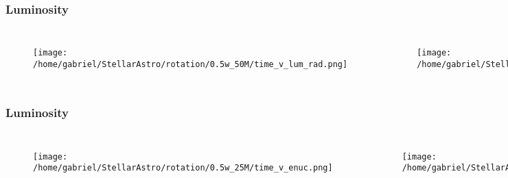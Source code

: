 \documentclass{beamer}
\begin{document}
\begin{frame}
\frametitle{Luminosity}
        \begin{columns}[c]
\begin{figure}
    \begin{center}
      \texttt{[image: /home/gabriel/StellarAstro/rotation/0.5w\_50M/time\_v\_lum\_rad.png]}
    \end{center}
  \end{figure}

        \begin{figure}
    \begin{center}
      \texttt{[image: /home/gabriel/StellarAstro/rotation/0.9w\_50M/time\_v\_lum\_rad.png]}
    \end{center}
  \end{figure}

        \end{columns}
\end{frame}



\begin{frame}
\frametitle{Luminosity}
        \begin{columns}[c]
\begin{figure}
    \begin{center}
      \texttt{[image: /home/gabriel/StellarAstro/rotation/0.5w\_25M/time\_v\_enuc.png]}
    \end{center}
  \end{figure}

        \begin{figure}
    \begin{center}
      \texttt{[image: /home/gabriel/StellarAstro/rotation/0.9w\_25M/time\_v\_enuc.png]}
    \end{center}
  \end{figure}

        \end{columns}
\end{frame}

\end{document}
